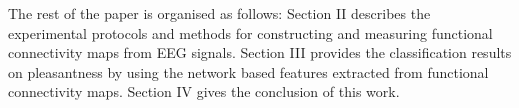 The rest of the paper is organised as follows: Section II describes the experimental protocols and methods for constructing and measuring functional connectivity maps from EEG signals. Section III provides the classification results on pleasantness by using the network based features extracted from functional connectivity maps. Section IV gives the conclusion of this work. 